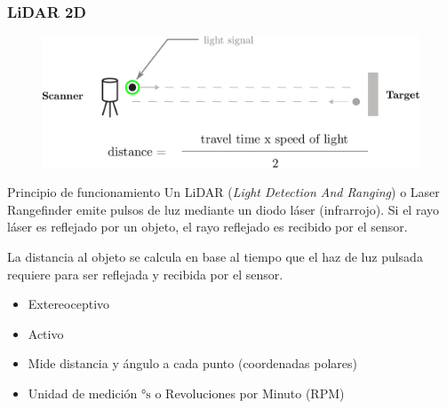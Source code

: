 \begin{frame}
    \frametitle{LiDAR 2D}
    
    \begin{figure}[!h]
        \centering
        \includegraphics[width=0.8\columnwidth]{images/lidar_concept.pdf}
    \end{figure}
    \footnotesize
    \begin{block}{Principio de funcionamiento}
     Un LiDAR (\emph{Light Detection And Ranging}) o Laser Rangefinder emite pulsos de luz mediante un diodo láser (infrarrojo). Si el rayo láser es reflejado por un objeto, el rayo reflejado es recibido por el sensor.
     
     La distancia al objeto se calcula en base al tiempo que el haz de luz pulsada requiere para ser reflejada y recibida por el sensor.
    \end{block}
    
    \begin{itemize}
        \item Extereoceptivo
        \item Activo
        \item Mide distancia y ángulo a cada punto (coordenadas polares)
        \item Unidad de medición $\si{\degree\second}$ o Revoluciones por Minuto (RPM)
    \end{itemize}


\end{frame}

